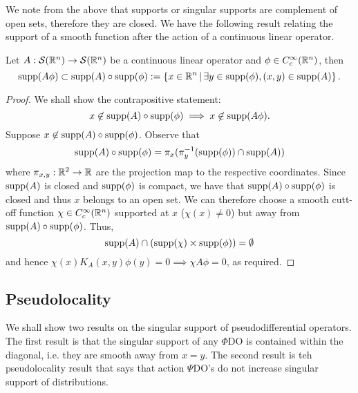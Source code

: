 \documentclass[12pt]{article}
\begin{document}
We note from the above that supports or singular supports are complement of open sets, therefore they are closed. 
We have the following result relating the support of a smooth function after the action of a continuous linear operator. 
\begin{fprop}
    Let $A: \mathcal{S}({\mathbb R}^n) \to \mathcal{S}({\mathbb R}^n)$ be a continuous linear operator and $\phi \in C^\infty_c({\mathbb R}^n)$, then
    \[
    \mathrm{supp}(A \phi) \subset \mathrm{supp}(A) \circ \mathrm{supp}(\phi) := \left\{x \in {\ensuremath {\mathbb R}}^n \, | \, \exists y \in \mathrm{supp}(\phi), (x, y) \in \mathrm{supp}(A) \right\}. 
    \]
\end{fprop}
\begin{proof}
    We shall show the contrapositive statement:
    \[
    x \not \in \mathrm{supp}(A) \circ \mathrm{supp}(\phi) \implies x \not \in \mathrm{supp}(A \phi). 
    \]
    Suppose $x \not \in \mathrm{supp}(A) \circ \mathrm{supp}(\phi)$. Observe that 
    \[
    \mathrm{supp}(A) \circ \mathrm{supp}(\phi) = \pi_x(\pi_y^{-1}(\mathrm{supp}(\phi)) \cap \mathrm{supp}(A))
    \]
    where $\pi_{x, y} : {\mathbb R}^2 \to {\ensuremath {\mathbb R}}$ are the projection map to the respective coordinates. Since $\mathrm{supp}(A)$ is closed and $\mathrm{supp}(\phi)$ is compact, we have that $\mathrm{supp}(A) \circ \mathrm{supp}(\phi)$ is closed and thus $x$ belongs to an open set. We can therefore choose a smooth cutt-off function $\chi \in C^\infty_c({\mathbb R}^n)$ supported at $x$ ($\chi(x) \neq 0$) but away from $\mathrm{supp}(A) \circ \mathrm{supp}(\phi)$. Thus, 
    \[
    \mathrm{supp}(A) \cap (\mathrm{supp}(\chi) \times \mathrm{supp}(\phi)) = \emptyset
    \]
    and hence $\chi(x) K_A(x, y) \phi(y) = 0 \implies \chi A \phi = 0$, as required. 
\end{proof}



\subsection{Pseudolocality} 
We shall show two results on the singular support of pseudodifferential operators. The first result is that the singular support of any $\Phi$DO is contained within the diagonal, i.e. they are smooth away from $x = y$. The second result is teh pseudolocality result that says that action $\Psi$DO's do not increase singular support of distributions. 
\end{document}
